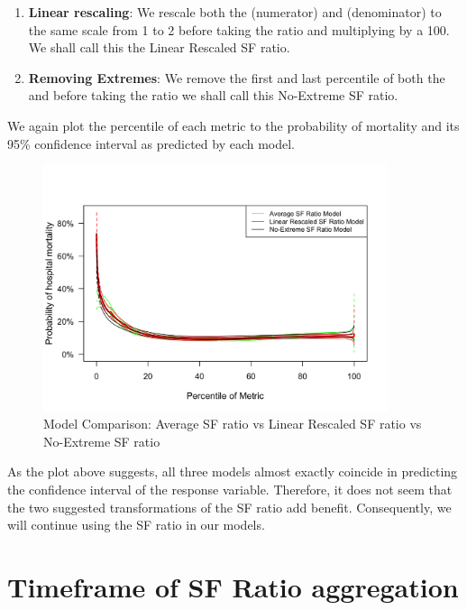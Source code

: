 \begin{enumerate}
	\item \textbf{Linear rescaling}: We rescale both the \Sp (numerator) and \Fi (denominator) to the same scale from 1 to 2 before taking the ratio and multiplying by a 100. We shall call this the Linear Rescaled SF ratio. 
	\item \textbf{Removing Extremes}: We remove the first and last percentile of 
	both the \Sp and \Fi before taking the ratio we shall call this No-Extreme SF ratio. 
\end{enumerate} 

We again plot the percentile of each metric to the probability of mortality and its 95\% confidence interval as predicted by each model. 

\begin{figure}[H]
	\centering
	\includegraphics[width=0.9\textwidth]{figures/doestransformationhelp-4.png}
	\caption{Model Comparison: Average SF ratio vs Linear Rescaled SF ratio vs No-Extreme SF ratio}
	\label{fig:toratioornot}
\end{figure}

As the plot above suggests, all three models almost exactly coincide in predicting the confidence interval of the response variable. Therefore, it does not seem that the two suggested transformations of the SF ratio add benefit. Consequently, we will continue using the SF ratio in our models. 
\section{Timeframe of SF Ratio aggregation}

